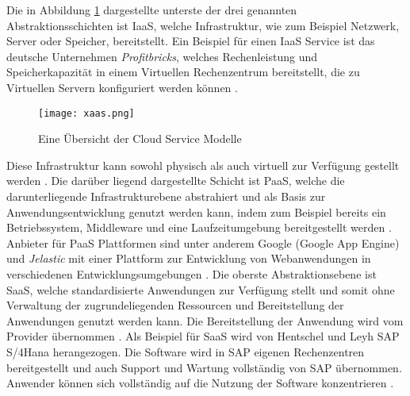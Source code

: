 Die in Abbildung \ref{fig:XaaS} dargestellte unterste der drei genannten Abstraktionsschichten ist \ac{IaaS}, welche Infrastruktur, wie zum Beispiel Netzwerk, Server oder Speicher, bereitstellt. Ein Beispiel für einen \ac{IaaS} Service ist das deutsche Unternehmen \textit{Profitbricks}, welches Rechenleistung und Speicherkapazität in einem Virtuellen Rechenzentrum bereitstellt, die zu Virtuellen Servern konfiguriert werden können \cite[Vgl.][S. 12]{Reinheimer2018}.

\begin{figure}[H]
    \centering
    \texttt{[image: xaas.png]}
    \caption{Eine Übersicht der Cloud Service Modelle \cite[Eigene Darstellung nach][S. 33]{Maenhaut2016}\cite[Ergänzt durch][]{Toroman2018}}
    \label{fig:XaaS}
\end{figure}

Diese Infrastruktur kann sowohl physisch als auch virtuell zur Verfügung gestellt werden \cite[Vgl.][S. 9f]{Reinheimer2018}. Die darüber liegend dargestellte Schicht ist \ac{PaaS}, welche die darunterliegende Infrastrukturebene abstrahiert und als Basis zur Anwendungsentwicklung genutzt werden kann, indem zum Beispiel bereits ein Betriebssystem, Middleware und eine Laufzeitumgebung bereitgestellt werden \cite[Vgl.][S. 10]{Reinheimer2018}. Anbieter für \ac{PaaS} Plattformen sind unter anderem Google (Google App Engine) und \textit{Jelastic} mit einer Plattform zur Entwicklung von Webanwendungen in verschiedenen Entwicklungsumgebungen \cite[Vgl.][S. 13]{Reinheimer2018}. Die oberste Abstraktionsebene ist \ac{SaaS}, welche standardisierte Anwendungen zur Verfügung stellt und somit ohne Verwaltung der zugrundeliegenden Ressourcen und Bereitstellung der Anwendungen genutzt werden kann. Die Bereitstellung der Anwendung wird vom Provider übernommen \cite[Vgl.][S. 11]{Reinheimer2018}. Als Beispiel für \ac{SaaS} wird von Hentschel und Leyh SAP S/4Hana herangezogen. Die Software wird in SAP eigenen Rechenzentren bereitgestellt und auch Support und Wartung vollständig von SAP übernommen. Anwender können sich vollständig auf die Nutzung der Software konzentrieren \cite[Vgl.][S. 14]{Reinheimer2018}. \pagebreak

